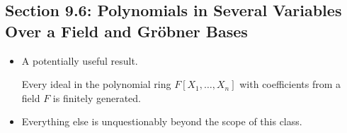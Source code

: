 \documentclass[../notes.tex]{subfiles}
\begin{document}
\subsection*{Section 9.6: Polynomials in Several Variables Over a Field and Gr\"{o}bner Bases}
\begin{itemize}
    \item A potentially useful result.
    \begin{corollary}\label{cly:9.22}
        Every ideal in the polynomial ring $F[X_1,\dots,X_n]$ with coefficients from a field $F$ is finitely generated.
    \end{corollary}
    \item Everything else is unquestionably beyond the scope of this class.
\end{itemize}
\end{document}

